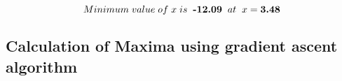 \documentclass[journal,10pt,twocolumn]{article}
\begin{document}
\begin{equation}
    Minimum \hspace{0.1cm}value \hspace{0.1cm}of \hspace{0.1cm}x \hspace{0.1cm}is\hspace{0.2cm} \textbf{-12.09} \hspace{0.2cm} at \hspace{0.2cm} x=\textbf{3.48}
\end{equation}

\begin{flushleft}
\subsection{Calculation of Maxima using gradient ascent algorithm}
\end{flushleft}
\end{document}
